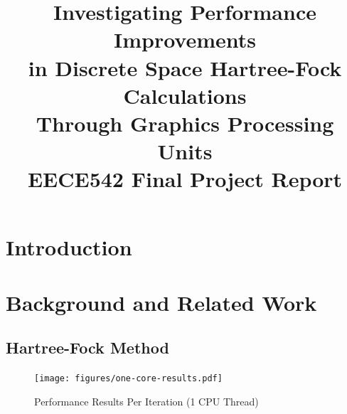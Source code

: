 \documentclass[journal, twoside]{IEEEtran}
\begin{document}

\title{Investigating Performance Improvements\\in Discrete Space Hartree-Fock Calculations\\Through Graphics Processing Units\\{\large EECE542 Final Project Report}}
\author{
}

%
{}
\maketitle

\section{Introduction}

\lipsum[1]

\section{Background and Related Work}

\lipsum[1]

\subsection{Hartree-Fock Method}

\cite{szabo-ostlund}
\lipsum[1]

\begin{figure}[h]
\centering
\texttt{[image: figures/one-core-results.pdf]}
\caption{Performance Results Per Iteration (1 CPU Thread)}
\label{perf-results-per-iteration-one-core}
\end{figure}
\end{document}
